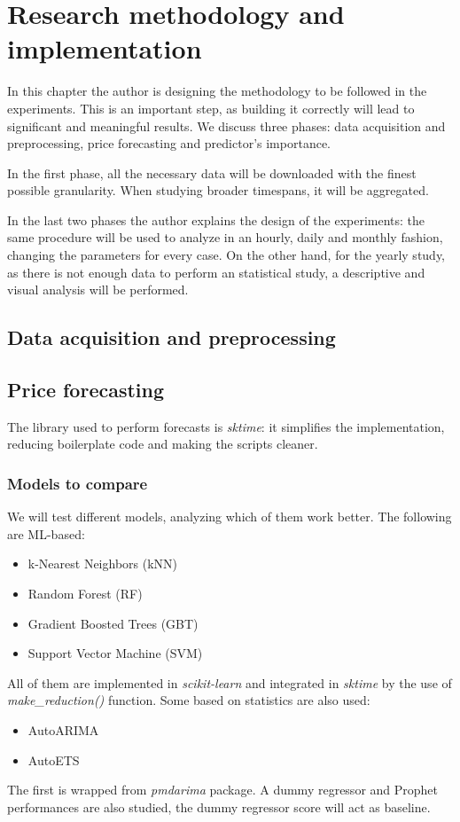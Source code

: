 \chapter{Research methodology and implementation}
In this chapter the author is designing the methodology to be followed in the experiments. This is an important step, as building it correctly will lead to significant and meaningful results.
We discuss three phases: data acquisition and preprocessing, price forecasting and predictor's importance.

In the first phase, all the necessary data will be downloaded with the finest possible granularity.
When studying broader timespans, it will be aggregated.

In the last two phases the author explains the design of the experiments: the same procedure will be used to analyze in an hourly, daily and monthly fashion, changing the parameters for every case.
On the other hand, for the yearly study, as there is not enough data to perform an statistical study, a descriptive and visual analysis will be performed.

\section{Data acquisition and preprocessing}


\section{Price forecasting}
The library used to perform forecasts is \textit{sktime}: it simplifies the implementation, reducing boilerplate code and making the scripts cleaner.

\subsection{Models to compare}
We will test different models, analyzing which of them work better. The following are ML-based:
\begin{itemize}
    \item k-Nearest Neighbors (kNN)
    \item Random Forest (RF)
    \item Gradient Boosted Trees (GBT)
    \item Support Vector Machine (SVM)
\end{itemize}
All of them are implemented in \textit{scikit-learn} and integrated in \textit{sktime} by the use of \textit{make\_reduction()} function. Some based on statistics are also used:
\begin{itemize}
    \item AutoARIMA
    \item AutoETS
\end{itemize}
The first is wrapped from \textit{pmdarima} package. A dummy regressor and Prophet performances are also studied, the dummy regressor score will act as baseline.

